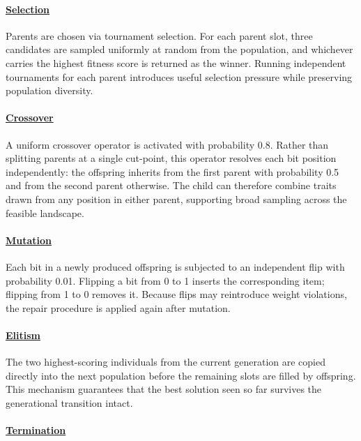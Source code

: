 \documentclass[12pt, a4paper]{article}
\begin{document}
\paragraph*{\underline{Selection}}

Parents are chosen via tournament selection. For each parent slot, three candidates are sampled uniformly at random from the population, and whichever carries the highest fitness score is returned as the winner. Running independent tournaments for each parent introduces useful selection pressure while preserving population diversity.

\paragraph*{\underline{Crossover}}

A uniform crossover operator is activated with probability 0.8. Rather than splitting parents at a single cut-point, this operator resolves each bit position independently: the offspring inherits from the first parent with probability 0.5 and from the second parent otherwise. The child can therefore combine traits drawn from any position in either parent, supporting broad sampling across the feasible landscape.

\paragraph*{\underline{Mutation}}

Each bit in a newly produced offspring is subjected to an independent flip with probability 0.01. Flipping a bit from 0 to 1 inserts the corresponding item; flipping from 1 to 0 removes it. Because flips may reintroduce weight violations, the repair procedure is applied again after mutation.

\paragraph*{\underline{Elitism}}

The two highest-scoring individuals from the current generation are copied directly into the next population before the remaining slots are filled by offspring. This mechanism guarantees that the best solution seen so far survives the generational transition intact.

\paragraph*{\underline{Termination}}
\end{document}
